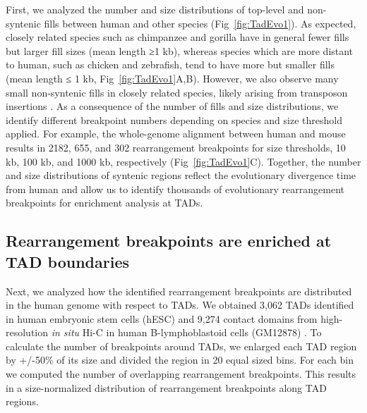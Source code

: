 \documentclass[a4paper,twoside=true,openright,parskip=full,chapterprefix=true,11pt,headings=normal,bibliography=totoc,listof=totoc,titlepage=on,captions=tableabove,draft=false]{scrreprt}
\theoremstyle{definition}
\theoremstyle{definition}
\theoremstyle{definition}
\theoremstyle{remark}
\begin{document}
First, we analyzed the number and size distributions of top-level and
non-syntenic fills between human and other species
(Fig~\ref{fig:TadEvo1}). As expected, closely related species such as
chimpanzee and gorilla have in general fewer fills but larger fill sizes
(mean length ≥1 kb), whereas species which are more distant to human,
such as chicken and zebrafish, tend to have more but smaller fills (mean
length ≤ 1 kb, Fig~\ref{fig:TadEvo1}A,B). However, we also observe many
small non-syntenic fills in closely related species, likely arising from
transposon insertions \citep{Mills2006}. As a consequence of the number
of fills and size distributions, we identify different breakpoint
numbers depending on species and size threshold applied. For example,
the whole-genome alignment between human and mouse results in 2182, 655,
and 302 rearrangement breakpoints for size thresholds, 10 kb, 100 kb,
and 1000 kb, respectively (Fig~\ref{fig:TadEvo1}C). Together, the number
and size distributions of syntenic regions reflect the evolutionary
divergence time from human and allow us to identify thousands of
evolutionary rearrangement breakpoints for enrichment analysis at TADs.

\hypertarget{rearrangement-breakpoints-are-enriched-at-tad-boundaries}{%
\subsection{Rearrangement breakpoints are enriched at TAD
boundaries}\label{rearrangement-breakpoints-are-enriched-at-tad-boundaries}}

Next, we analyzed how the identified rearrangement breakpoints are
distributed in the human genome with respect to TADs. We obtained 3,062
TADs identified in human embryonic stem cells (hESC) \citep{Dixon2012}
and 9,274 contact domains from high-resolution \emph{in situ} Hi-C in
human B-lymphoblastoid cells (GM12878) \citep{Rao2014}. To calculate the
number of breakpoints around TADs, we enlarged each TAD region by
+/-50\% of its size and divided the region in 20 equal sized bins. For
each bin we computed the number of overlapping rearrangement
breakpoints. This results in a size-normalized distribution of
rearrangement breakpoints along TAD regions.
\end{document}
